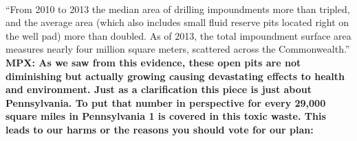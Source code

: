 \documentclass[11pt]{article}
\begin{document}
	\paragraph{}
	``From 2010 to 2013 the median area of drilling impoundments more than tripled, and the average area (which also includes small fluid reserve pits located right on the well pad) more than doubled. As of 2013, the total impoundment surface area measures nearly four million square meters, scattered across the Commonwealth.''\newline
	\textbf{MPX: As we saw from this evidence, these open pits are not diminishing but actually growing causing devastating effects to health and environment. Just as a clarification this piece is just about Pennsylvania.  To put that number in perspective for every 29,000 square miles in Pennsylvania 1 is covered in this toxic waste.  This leads to our harms or the reasons you should vote for our plan:}
\end{document}
